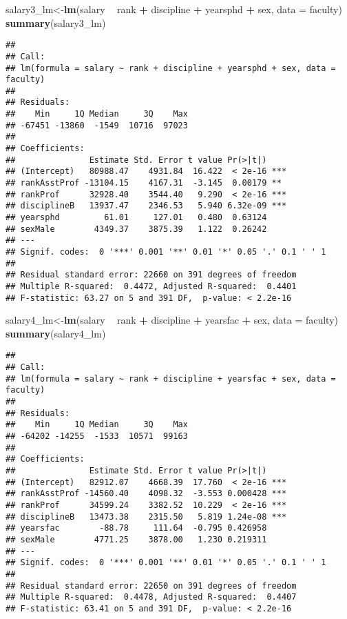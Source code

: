 \documentclass[]{article}
\newenvironment{Shaded}{\begin{snugshade}}{\end{snugshade}}
\newcommand{\KeywordTok}[1]{\textcolor[rgb]{0.13,0.29,0.53}{\textbf{#1}}}
\newcommand{\DataTypeTok}[1]{\textcolor[rgb]{0.13,0.29,0.53}{#1}}
\newcommand{\StringTok}[1]{\textcolor[rgb]{0.31,0.60,0.02}{#1}}
\newcommand{\OperatorTok}[1]{\textcolor[rgb]{0.81,0.36,0.00}{\textbf{#1}}}
\newcommand{\NormalTok}[1]{#1}
\begin{document}
\begin{Shaded}
\begin{Highlighting}[]
\NormalTok{salary3_lm<-}\KeywordTok{lm}\NormalTok{(salary }\OperatorTok{~}\StringTok{ }\NormalTok{rank }\OperatorTok{+}\StringTok{ }\NormalTok{discipline }\OperatorTok{+}\StringTok{ }\NormalTok{yearsphd }\OperatorTok{+}\StringTok{ }\NormalTok{sex, }\DataTypeTok{data =}\NormalTok{ faculty)}
\KeywordTok{summary}\NormalTok{(salary3_lm)}
\end{Highlighting}
\end{Shaded}

\begin{verbatim}
## 
## Call:
## lm(formula = salary ~ rank + discipline + yearsphd + sex, data = faculty)
## 
## Residuals:
##    Min     1Q Median     3Q    Max 
## -67451 -13860  -1549  10716  97023 
## 
## Coefficients:
##               Estimate Std. Error t value Pr(>|t|)    
## (Intercept)   80988.47    4931.84  16.422  < 2e-16 ***
## rankAsstProf -13104.15    4167.31  -3.145  0.00179 ** 
## rankProf      32928.40    3544.40   9.290  < 2e-16 ***
## disciplineB   13937.47    2346.53   5.940 6.32e-09 ***
## yearsphd         61.01     127.01   0.480  0.63124    
## sexMale        4349.37    3875.39   1.122  0.26242    
## ---
## Signif. codes:  0 '***' 0.001 '**' 0.01 '*' 0.05 '.' 0.1 ' ' 1
## 
## Residual standard error: 22660 on 391 degrees of freedom
## Multiple R-squared:  0.4472, Adjusted R-squared:  0.4401 
## F-statistic: 63.27 on 5 and 391 DF,  p-value: < 2.2e-16
\end{verbatim}

\begin{Shaded}
\begin{Highlighting}[]
\NormalTok{salary4_lm<-}\KeywordTok{lm}\NormalTok{(salary }\OperatorTok{~}\StringTok{ }\NormalTok{rank }\OperatorTok{+}\StringTok{ }\NormalTok{discipline }\OperatorTok{+}\StringTok{ }\NormalTok{yearsfac }\OperatorTok{+}\StringTok{ }\NormalTok{sex, }\DataTypeTok{data =}\NormalTok{ faculty)}
\KeywordTok{summary}\NormalTok{(salary4_lm)}
\end{Highlighting}
\end{Shaded}

\begin{verbatim}
## 
## Call:
## lm(formula = salary ~ rank + discipline + yearsfac + sex, data = faculty)
## 
## Residuals:
##    Min     1Q Median     3Q    Max 
## -64202 -14255  -1533  10571  99163 
## 
## Coefficients:
##               Estimate Std. Error t value Pr(>|t|)    
## (Intercept)   82912.07    4668.39  17.760  < 2e-16 ***
## rankAsstProf -14560.40    4098.32  -3.553 0.000428 ***
## rankProf      34599.24    3382.52  10.229  < 2e-16 ***
## disciplineB   13473.38    2315.50   5.819 1.24e-08 ***
## yearsfac        -88.78     111.64  -0.795 0.426958    
## sexMale        4771.25    3878.00   1.230 0.219311    
## ---
## Signif. codes:  0 '***' 0.001 '**' 0.01 '*' 0.05 '.' 0.1 ' ' 1
## 
## Residual standard error: 22650 on 391 degrees of freedom
## Multiple R-squared:  0.4478, Adjusted R-squared:  0.4407 
## F-statistic: 63.41 on 5 and 391 DF,  p-value: < 2.2e-16
\end{verbatim}
\end{document}
